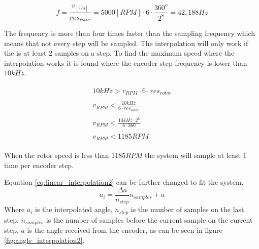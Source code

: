 \begin{equation}
    f = \frac{v_{[^o/s]}}{res_{rotor}} = 5000 [RPM] \cdot 6 \cdot \frac{360^o}{2^8} = 42,188Hz
    \label{eq:encoder_step_frequency}
\end{equation}

The frequency is more than four times faster than the sampling frequency which means that not every step will be sampled. The interpolation will only work if the is at least 2 samples on a step. To find the maximum speed where the interpolation works it is found where the encoder step frequency is lower than $10kHz$.

\begin{subequations}
	\begin{align}
    	\begin{split}
        	10kHz > v_{RPM}\cdot 6 \cdot res_{rotor}
    	\end{split} \\ 
    	\begin{split}
        	v_{RPM} < \frac{10kHz}{6 \cdot res_{rotor}}
    	\end{split} \\
    	\begin{split}
        	v_{RPM} < \frac{10kHz \cdot 2^8}{6 \cdot 360}
    	\end{split} \\
    	\begin{split}
        	v_{RPM} < 1185 RPM
    	\end{split} 
	\end{align}
\end{subequations}

When the rotor speed is less than $1185RPM$ the system will sample at least $1$ time per encoder step.

Equation \ref{eq:linear_interpolation2} can be further changed to fit the system.
\begin{equation}
    a_{i} = \frac{\Delta a}{n_{step}} n_{samples} + a
    \label{eq:linear_interpolation3}
\end{equation}
Where $a_{i}$ is the interpolated angle, $n_{step}$ is the number of samples on the last step, $n_{samples}$ is the number of samples before the current sample on the current step, $a$ is the angle received from the encoder, as can be seen in figure \ref{fig:angle_interpolation2}.

